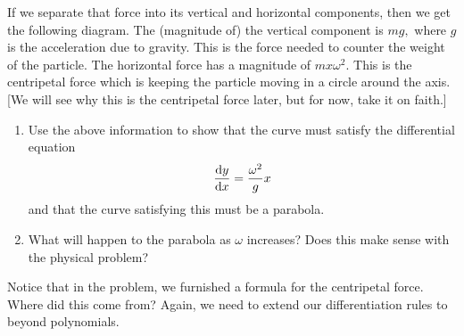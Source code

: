 If we separate that force into its vertical and horizontal components,
then we get the following diagram.  
The (magnitude of) the vertical component is $mg,$ where $g$ is the
acceleration due to gravity.  This is the force needed to counter the
weight of the particle.  The horizontal force has a magnitude of
$mx\omega^2.$ This is the centripetal force which is keeping the
particle moving in a circle around the axis.  [We will see why this is
the centripetal force later, but for now, take it on faith.]
    \begin{enumerate}[label={\bf{}(\alph*)}]
    \item Use the above information to show that the curve must
      satisfy the differential equation
      $$
      \frac{\text{d}{y}}{\text{d}{x}}=\frac{\omega^2}{g} x
      $$
      and that the curve satisfying this must be a parabola.
    \item What will happen to the parabola as $\omega$ increases?  Does this
      make sense with the physical problem?
    \end{enumerate}
    
Notice that in the problem, we furnished a formula for the centripetal
force.  Where did this come from?  Again, we need to extend our
differentiation rules to beyond polynomials.

